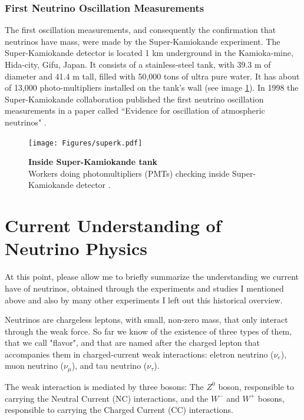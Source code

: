 \subsubsection{First Neutrino Oscillation Measurements}
The first oscillation measurements, and consequently the confirmation that neutrinos have mass, were made by the Super-Kamiokande experiment. The Super-Kamiokande detector is located 1 km underground in the Kamioka-mine, Hida-city, Gifu, Japan. It consists of a stainless-steel tank, with 39.3 m of diameter and 41.4 m tall, filled with 50,000 tons of ultra pure water. It has about of 13,000 photo-multipliers installed on the tank's wall (see image \ref{superk_picture}).
In 1998 the Super-Kamiokande collaboration published the first neutrino oscillation measurements in a paper called ``Evidence for oscillation of atmospheric neutrinos" \cite{first_kamioka_measure}.
%
\begin{figure}
	\begin{center}
		\texttt{[image: Figures/superk.pdf]}
		\caption[Inside Super-Kamiokande tank]{ {\textbf{Inside Super-Kamiokande tank}}\\Workers doing photomultipliers (PMTs) checking inside Super-Kamiokande detector \cite{superk_picture}.}
		\label{superk_picture}	
	\end{center}
\end{figure}
%

\section{Current Understanding of Neutrino Physics}

At this point, please allow me to briefly summarize the understanding we current have of neutrinos, obtained through the experiments and studies I mentioned above and also by many other experiments I left out this historical overview. 

Neutrinos are chargeless leptons, with small, non-zero mass, that only interact through the weak force. So far we know of the existence of three types of them, that we call "flavor", and that are named after the charged lepton that accompanies them in charged-current weak interactions: eletron neutrino ($\nu_e$), muon neutrino ($\nu_{\mu}$), and tau neutrino ($\nu_{\tau}$). 

The weak interaction is mediated by three bosons: The $Z^{0}$ boson, responsible to carrying the Neutral Current (NC) interactions, and the $W^{-}$ and $W^{+}$ bosons, responsible to carrying the Charged Current (CC) interactions.   

